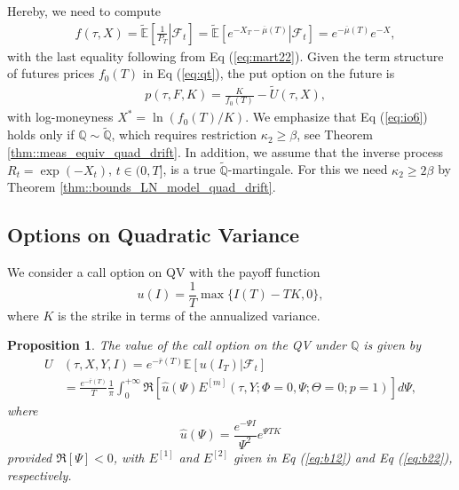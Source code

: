 \documentclass[pdftex,11pt,a4paper] {article}
\newtheorem{proposition}{Proposition}[section]
\begin{document}
Hereby, we need to compute
\begin{equation} \label{eq:io7}
\begin{split}
  & f(\tau, X) = \mathbb{\tilde{E}}\left[\left.\frac{1}{P_{T}}\right|\mathcal{F}_{t}\right]=
  \mathbb{\tilde{E}}\left[\left.e^{-X_T-\overline{\mu}(T)}\right|\mathcal{F}_{t}\right]=
  e^{-\overline{\mu}(T)}e^{-X},
\end{split}
\end{equation}
with the last equality following from Eq (\ref{eq:mart22}). Given the term structure of futures prices $f_{0}(T)$ in Eq (\ref{eq:qt}), the put option on the future is
\begin{equation} \label{eq:io10}
\begin{split}
  & p(\tau, F,K) =   \frac{K}{f_{0}(T)}- \widetilde{U}(\tau, X),
\end{split} 
\end{equation}
with log-moneyness $X^{*}=\ln(f_{0}(T)/K)$. 
We emphasize that Eq (\ref{eq:io6}) holds only if $\mathbb{Q}\sim \tilde{\mathbb{Q}}$, which requires restriction $\kappa_2\ge \beta$, see Theorem \ref {thm::meas_equiv_quad_drift}. 
In addition, we assume that the inverse process $R_t=\exp(-X_t)$, $t\in(0,T]$, is a true $\tilde{\mathbb{Q}}$-martingale. For this we need $\kappa_2\ge 2\beta$ by Theorem \ref{thm::bounds_LN_model_quad_drift}.



\subsection{Options on Quadratic Variance}

We consider a call option on QV with the payoff function
\begin{equation}\label{eq:qv0}
u(I)=\frac{1}{T}\max\{I(T)-TK,0\},
\end{equation}
where $K$ is the strike in terms of the annualized variance.


\begin{proposition}\label{qmma} The value of the call option on the QV under $\mathbb{Q}$ is given by
\begin{equation}\label{eq:qv1}
\begin{split}
U&(\tau,X,Y,I)=e^{-\bar{r}(T)}\mathbb{E}\left[\left.u(I_T)\right|\mathcal{F}_{t}\right]\\
& =\frac{e^{-\bar{r}(T)}}{T}\frac{1}{\pi}\int_0^{+\infty}\Re\left[\hat{u}(\Psi) E^{[m]}(\tau,Y; \Phi=0,\Psi;\Theta=0;p=1)\right]d\Psi,
\end{split}
\end{equation}
where
\begin{equation}\label{eq:qv1a}
\hat{u}(\Psi)=\frac{e^{-\Psi I}}{\Psi^2}e^{\Psi TK}
\end{equation}
provided $\Re[\Psi]<0$, with $E^{[1]}$ and $E^{[2]}$ given in Eq (\ref{eq:b12}) and Eq (\ref{eq:b22}), respectively.
\end{proposition}
\end{document}
